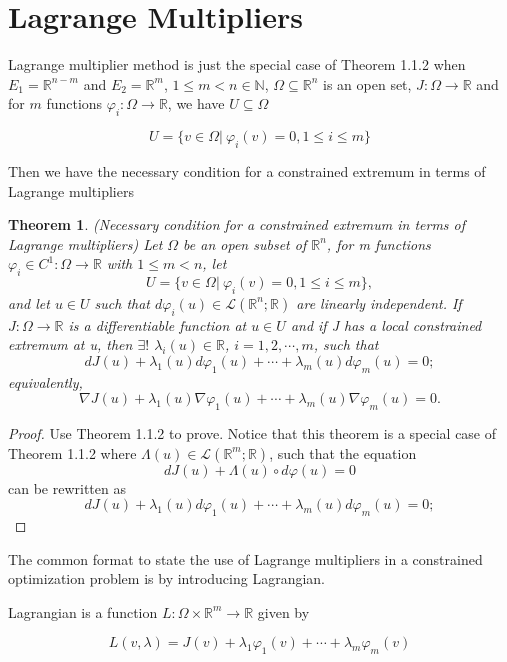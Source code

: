 \documentclass[a4paper]{report}
\newtheorem{theorem}{Theorem}[section]
\begin{document}
\section{Lagrange Multipliers}

Lagrange multiplier method is just the special case of Theorem 1.1.2 when $E_1=\mathbb R^{n-m}$ and $E_2=\mathbb R^m$, $1\leq m < n\in \mathbb N$, $\Omega\subseteq\mathbb R^n$ is an open set, $J:\Omega\to\mathbb R$ and for $m$ functions $\varphi_i:\Omega\to\mathbb R$, we have $U\subseteq \Omega$

\[
    U=\{v\in\Omega|\ \varphi_i(v)=0,1\leq i\leq m\}
\]

Then we have the necessary condition for a constrained extremum in terms of Lagrange multipliers

\begin{theorem}
    (Necessary condition for a constrained extremum in terms of Lagrange multipliers\cite{gallier2019algebra}) Let $\Omega$ be an open subset of $\mathbb R^n$, for m functions $\varphi_i\in C^1:\Omega\to\mathbb R$ with $1\leq m < n$, let
    \[
        U=\{v\in\Omega|\ \varphi_i(v)=0,1\leq i\leq m\},
    \]
    and let $u\in U$ such that $d\varphi_i(u)\in\mathcal L(\mathbb R^n;\mathbb R)$ are linearly independent. If $J:\Omega\to \mathbb R$ is a differentiable function at $u\in U$ and if J has a local constrained extremum at u, then $\exists!$ $\lambda_i(u)\in\mathbb R$, $i=1,2,\cdots,m$, such that
    \[
        dJ(u)+\lambda_1(u)d\varphi_1(u)+\cdots+\lambda_m(u)d\varphi_m(u)=0;
    \]
    equivalently,
    \[
        \nabla J(u)+\lambda_1(u)\nabla\varphi_1(u)+\cdots+\lambda_m(u)\nabla\varphi_m(u)=0.
    \]
\end{theorem}
\begin{proof}
    Use Theorem 1.1.2 to prove. Notice that this theorem is a special case of Theorem 1.1.2 where $\Lambda(u)\in \mathcal L(\mathbb R^m;\mathbb R)$, such that the equation
    \[
        dJ(u)+\Lambda(u)\circ d\varphi(u)=0
    \]
    can be rewritten as 
    \[
        dJ(u)+\lambda_1(u)d\varphi_1(u)+\cdots+\lambda_m(u)d\varphi_m(u)=0;
    \]
\end{proof}

The common format to state the use of Lagrange multipliers in a constrained optimization problem is by introducing Lagrangian. 

Lagrangian is a function $L:\Omega\times\mathbb R^m\to\mathbb R$ given by

\[
    L(v,\lambda)=J(v)+\lambda_1\varphi_1(v)+\cdots+\lambda_m\varphi_m(v)
\]
\end{document}
